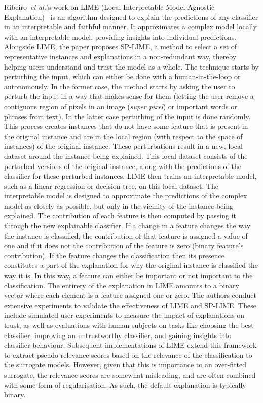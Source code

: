 Ribeiro~\textit{et al.}'s work on LIME (Local Interpretable Model-Agnostic Explanation)~\cite{Ribeiro0G16} is an algorithm designed to explain the predictions of any classifier in an interpretable and faithful manner. It approximates a complex model locally with an interpretable model, providing insights into individual predictions. Alongside LIME, the paper proposes SP-LIME, a method to select a set of representative instances and explanations in a non-redundant way, thereby helping users understand and trust the model as a whole. The technique starts by perturbing the input, which can either be done with a human-in-the-loop or autonomously. In the former case, the method starts by asking the user to perturb the input in a way that makes sense for them (\eg  letting the user remove a contiguous region of pixels in an image (\textit{super pixel}) or important words or phrases from text). In the latter case perturbing of the input is done randomly. This process creates instances that do not have some feature that is present in the original instance and are in the local region (with respect to the space of instances) of the original instance. These perturbations result in a new, local dataset around the instance being explained. This local dataset consists of the perturbed versions of the original instance, along with the predictions of the classifier for these perturbed instances. LIME then trains an interpretable model, such as a linear regression or decision tree, on this local dataset. The interpretable model is designed to approximate the predictions of the complex model as closely as possible, but only in the vicinity of the instance being explained. The contribution of each feature is then computed by passing it through the new explainable classifier. If a change in a feature changes the way the instance is classified, the contribution of that feature is assigned a value of one and if it does not the contribution of the feature is zero (binary feature's contribution). If the feature changes the classification then its presence constitutes a part of the explanation for why the original instance is classified the way it is. In this way, a feature can either be important or not important to the classification. The entirety of the explanation in LIME amounts to a binary vector where each element is a feature assigned one or zero. The authors conduct extensive experiments to validate the effectiveness of LIME and SP-LIME. These include simulated user experiments to measure the impact of explanations on trust, as well as evaluations with human subjects on tasks like choosing the best classifier, improving an untrustworthy classifier, and gaining insights into classifier behaviour. Subsequent implementations of LIME extend this framework to extract pseudo-relevance scores based on the relevance of the classification to the surrogate models. However, given that this is importance to an over-fitted surrogate, the relevance scores are somewhat misleading, and are often combined with some form of regularisation. As such, the default explanation is typically binary. 

